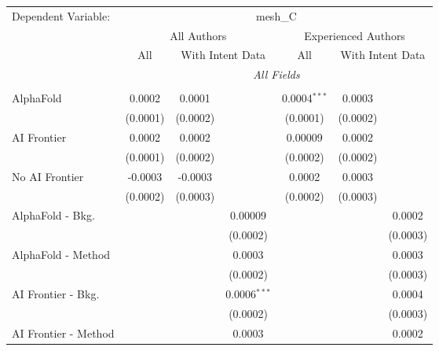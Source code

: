 \begingroup
\centering
\begin{tabular}{lcccccc}
   \tabularnewline \midrule \midrule
   Dependent Variable: & \multicolumn{6}{c}{mesh\_C}\\
 & \multicolumn{3}{c}{All Authors} & \multicolumn{3}{c}{Experienced Authors} \\
\cmidrule(lr){2-4} \cmidrule(lr){5-7}
 & \multicolumn{1}{c}{All} & \multicolumn{2}{c}{With Intent Data} & \multicolumn{1}{c}{All} & \multicolumn{2}{c}{With Intent Data} \\
\cmidrule(lr){2-2} \cmidrule(lr){3-4} \cmidrule(lr){5-5} \cmidrule(lr){6-7}
 & \multicolumn{6}{c}{\textit{All Fields}} \\ \\
   AlphaFold               & 0.0002   & 0.0001   &                & 0.0004$^{***}$ & 0.0003   &   \\   
                           & (0.0001) & (0.0002) &                & (0.0001)       & (0.0002) &   \\   
   AI Frontier             & 0.0002   & 0.0002   &                & 0.00009        & 0.0002   &   \\   
                           & (0.0001) & (0.0002) &                & (0.0002)       & (0.0002) &   \\   
   No AI Frontier          & -0.0003  & -0.0003  &                & 0.0002         & 0.0003   &   \\   
                           & (0.0002) & (0.0003) &                & (0.0002)       & (0.0003) &   \\   
   AlphaFold - Bkg.        &          &          & 0.00009        &                &          & 0.0002\\   
                           &          &          & (0.0002)       &                &          & (0.0003)\\   
   AlphaFold - Method      &          &          & 0.0003         &                &          & 0.0003\\   
                           &          &          & (0.0002)       &                &          & (0.0003)\\   
   AI Frontier - Bkg.      &          &          & 0.0006$^{***}$ &                &          & 0.0004\\   
                           &          &          & (0.0002)       &                &          & (0.0003)\\   
   AI Frontier - Method    &          &          & 0.0003         &                &          & 0.0002\\   

\end{tabular}

